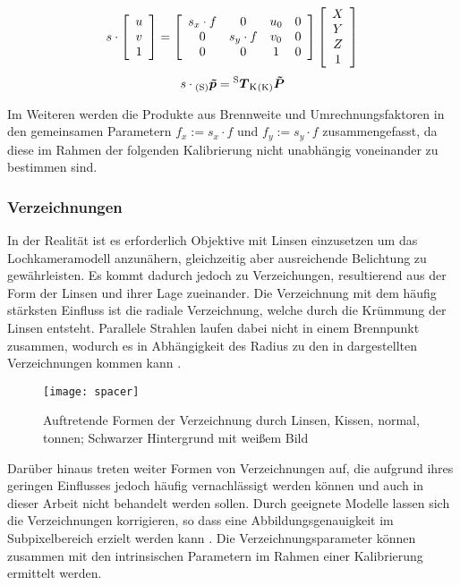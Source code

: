 \begin{equation}
s \cdot 
\mat{c}{
u\\
v\\
1
}
= 
\mat{cccc}{
s_x \cdot f & 0 & u_0 & 0\\
0 & s_y \cdot f & v_0 & 0\\
0 & 0 & 1 & 0
}
\mat{c}{
X\\
Y\\
Z\\
1
}
\label{eq.intrinsic}
\end{equation}
\begin{equation}
s \cdot {_{{\mathrm{(S)}}}}\mbox{\boldmath{$\tilde{p}$}} = {^{\mathrm{S}}\mbox{\boldmath{$T$}}_{\mathrm{K}}}{_{{\mathrm{(K)}}}}\mbox{\boldmath{$\tilde{P}$}}
\end{equation}

Im Weiteren werden die Produkte aus Brennweite und Umrechnungsfaktoren in den gemeinsamen Parametern $f_x := s_x \cdot f$ und $f_y := s_y \cdot f$ zusammengefasst, da diese im Rahmen der folgenden Kalibrierung nicht unabhängig voneinander zu bestimmen sind.

\subsubsection{Verzeichnungen}
In der Realität ist es erforderlich Objektive mit Linsen einzusetzen um das Lochkameramodell anzunähern, gleichzeitig aber ausreichende Belichtung zu gewährleisten. Es kommt dadurch jedoch zu Verzeichungen, resultierend aus der Form der Linsen und ihrer Lage zueinander. Die Verzeichnung mit dem häufig stärksten Einfluss ist die radiale Verzeichnung, welche durch die Krümmung der Linsen entsteht. Parallele Strahlen laufen dabei nicht in einem Brennpunkt zusammen, wodurch es in Abhängigkeit des Radius zu den in  dargestellten Verzeichnungen kommen kann .

\begin{figure}[ht]
	\begin{center}
		\texttt{[image: spacer]}
		\caption{Auftretende Formen der Verzeichnung durch Linsen, Kissen, normal, tonnen; Schwarzer Hintergrund mit weißem Bild}
		\label{fig.distortions}
	\end{center}
\end{figure}

Darüber hinaus treten weiter Formen von Verzeichnungen auf, die aufgrund ihres geringen Einflusses jedoch häufig vernachlässigt werden können und auch in dieser Arbeit nicht behandelt werden sollen. Durch geeignete Modelle lassen sich die Verzeichnungen \red[softwareseitig] korrigieren, so dass eine Abbildungsgenauigkeit im Subpixelbereich erzielt werden kann \red[\cite{}]. Die Verzeichnungsparameter können zusammen mit den intrinsischen Parametern im Rahmen einer Kalibrierung ermittelt werden. 

